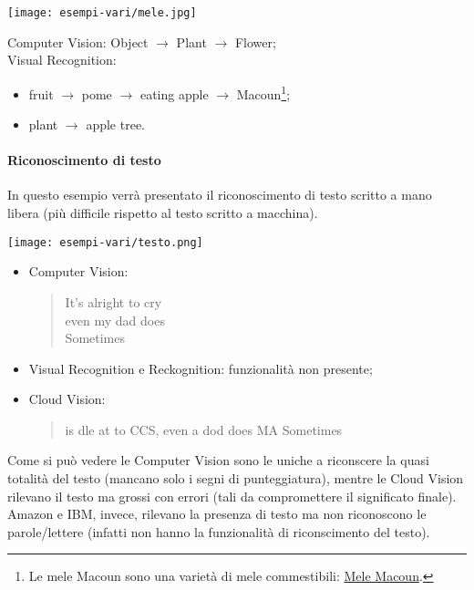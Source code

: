 \noindent
\begin{minipage}[b]{0.38\textwidth}
	\texttt{[image: esempi-vari/mele.jpg]}
	\label{fig:riconscimento-classificazione}
\end{minipage}
\hfill
\begin{minipage}[b]{0.6\textwidth}
	Computer Vision: \textsf{Object} $\rightarrow$ \textsf{Plant} $\rightarrow$ \textsf{Flower};\\
	Visual Recognition:
	\begin{itemize}
		\item \textsf{fruit} $\rightarrow$ \textsf{pome} $\rightarrow$ \textsf{eating apple} $\rightarrow$ \textsf{Macoun}\footnote{Le
		mele Macoun sono una varietà di mele commestibili: \href{https://en.wikipedia.org/wiki/Macoun_apple}{Mele Macoun}.};
		\item \textsf{plant} $\rightarrow$ \textsf{apple tree}.
	\end{itemize}
	\vfill
\end{minipage}
\noindent
%
\paragraph{Riconoscimento di testo}\label{par:riconscimento-testo}
In questo esempio verrà presentato il riconoscimento di testo scritto a mano libera (più difficile rispetto al testo scritto a macchina).

\begin{minipage}[b]{0.38\textwidth}
	\texttt{[image: esempi-vari/testo.png]}
	\label{fig:riconscimento-testo}
\end{minipage}
\hfill
\begin{minipage}[b]{0.6\textwidth}
	\begin{itemize}
		\item Computer Vision:
			{\footnotesize
			\begin{quote}
				It's alright to cry\\
				even my dad does\\
				Sometimes
			\end{quote}}
			\item Visual Recognition e Reckognition: funzionalità non presente;
			\item Cloud Vision:
			{\footnotesize
			\begin{quote}
				is dle at to CCS, even a dod does MA Sometimes
			\end{quote}}
		\end{itemize}
	\vfill
\end{minipage}
\noindent
Come si può vedere le Computer Vision sono le uniche a riconscere la quasi totalità del testo (mancano solo i segni di punteggiatura), mentre le Cloud Vision
rilevano il testo ma grossi con errori (tali da compromettere il significato finale).
Amazon e IBM, invece, rilevano la presenza di testo ma non riconoscono le parole/lettere (infatti non hanno la funzionalità di riconscimento del testo).
%
